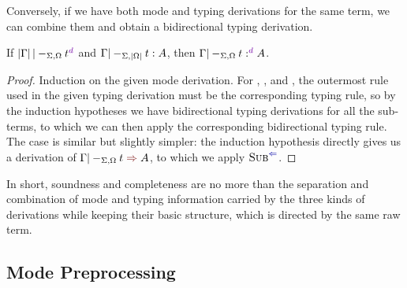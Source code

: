 Conversely, if we have both mode and typing derivations for the same term, we can combine them and obtain a bidirectional typing derivation.

\begin{lemma}[Completeness]\label{thm:term-completeness}
If\/ $\erase\Gamma |-_{\Sigma, \Omega} t^\dir{d}$ and\/ $\Gamma |-_{\Sigma, \left|\Omega\right|} t : A$, then $\Gamma |-_{\Sigma, \Omega} t :^\dir{d} A$.
\end{lemma}

\begin{proof}
Induction on the given mode derivation.
For , , and , the outermost rule used in the given typing derivation must be the corresponding typing rule, so by the induction hypotheses we have bidirectional typing derivations for all the sub-terms, to which we can then apply the corresponding bidirectional typing rule.
The  case is similar but slightly simpler: the induction hypothesis directly gives us a derivation of $\Gamma |-_{\Sigma,\Omega} t \syn A$, to which we apply $\ChkRule{Sub}$.
\end{proof}

In short, soundness and completeness are no more than the separation and combination of mode and typing information carried by the three kinds of derivations while keeping their basic structure, which is directed by the same raw term.

\subsection{Mode Preprocessing}
\label{sec:mode-preprocessing}

\newcommand{\True}{\mathbf{T}}
\newcommand{\False}{\mathbf{F}}

